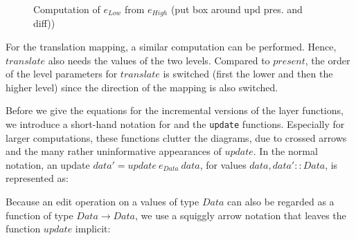 \begin{figure}
\begin{small}
\begin{center}
\begin{center}
\begin{small}
\bigskip \noindent
{}
\end{small}
\end{center}\caption{Computation of $e_{Low}$ from $e_{High}$ (put box around upd pres. and diff)) }\label{computeOps} 
\end{center}
\end{small}
\end{figure}

For the translation mapping, a similar computation can be performed. Hence, $translate$ also needs the values of the two levels. Compared to $present$, the order of the level parameters for $translate$ is switched (first the lower and then the higher level) since the direction of the mapping is also switched.

Before we give the equations for the incremental versions of the layer functions, we introduce a short-hand notation for and the \verb|update| functions. Especially for larger computations, these functions clutter the diagrams, due to crossed arrows and the many rather uninformative appearances of $update$. In the normal notation, an update $data' = update~e_{Data}~data$, for values 
$data, data' :: Data$, is represented as:\\

\begin{small}
\end{small}

Because an edit operation on a values of type $Data$ can also be regarded as a function of type 
$Data \rightarrow Data$, we use a squiggly arrow notation that leaves the function $update$ implicit:\\

